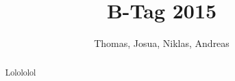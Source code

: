 \documentclass[a4paper,11pt]{article}
\title{B-Tag 2015}
\author{Thomas, Josua, Niklas, Andreas}
\begin{document}
\maketitle
\tableofcontents

\begin{abstract}
Lolololol
\end{abstract}

\section{}
\end{document}
